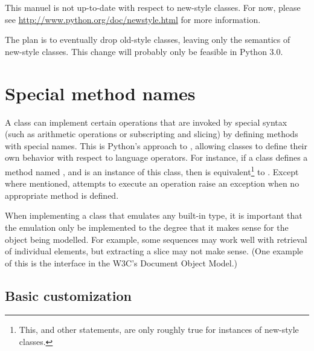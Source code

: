 This manuel is not up-to-date with respect to new-style classes.  For now,
please see \url{http://www.python.org/doc/newstyle.html} for more information.

The plan is to eventually drop old-style classes, leaving only the semantics of new-style classes.  This change will probably only be feasible in Python 3.0.

\section{Special method names\label{specialnames}}

A class can implement certain operations that are invoked by special
syntax (such as arithmetic operations or subscripting and slicing) by
defining methods with special names.
This is Python's approach to , allowing
classes to define their own behavior with respect to language
operators.  For instance, if a class defines
a method named , and  is an instance of
this class, then  is equivalent\footnote{This, and other
statements, are only roughly true for instances of new-style
classes.} to
.  Except where mentioned, attempts to execute
an operation raise an exception when no appropriate method is defined.

When implementing a class that emulates any built-in type, it is
important that the emulation only be implemented to the degree that it
makes sense for the object being modelled.  For example, some
sequences may work well with retrieval of individual elements, but
extracting a slice may not make sense.  (One example of this is the
 interface in the W3C's Document Object Model.)


\subsection{Basic customization\label{customization}}

